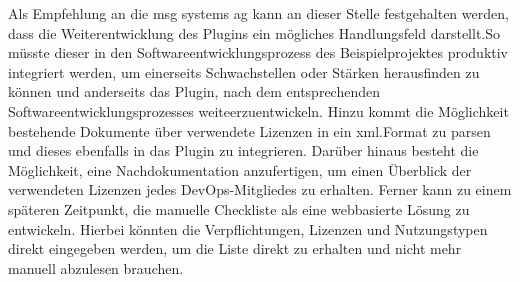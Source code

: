 Als Empfehlung an die msg systems ag kann an dieser Stelle festgehalten werden, dass die Weiterentwicklung des Plugins ein mögliches Handlungsfeld darstellt.So müsste dieser in den Softwareentwicklungsprozess des Beispielprojektes produktiv integriert werden, um einerseits Schwachstellen oder Stärken herausfinden zu können und anderseits das Plugin, nach dem entsprechenden Softwareentwicklungsprozesses weiteerzuentwickeln. Hinzu kommt die Möglichkeit bestehende Dokumente über verwendete Lizenzen in ein xml.Format zu parsen und dieses ebenfalls in das Plugin zu integrieren. Darüber hinaus besteht die Möglichkeit, eine Nachdokumentation anzufertigen, um einen Überblick der verwendeten Lizenzen jedes DevOps-Mitgliedes zu erhalten. Ferner kann zu einem späteren Zeitpunkt, die manuelle Checkliste als eine webbasierte Lösung zu entwickeln. Hierbei könnten die Verpflichtungen, Lizenzen und Nutzungstypen direkt eingegeben werden, um die Liste direkt zu erhalten und nicht mehr manuell abzulesen brauchen. 



